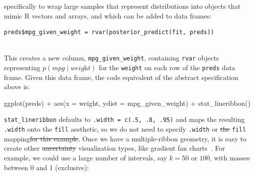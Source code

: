 \documentclass[journal]{vgtc}                     %
\newenvironment{centerverbatim}{%
\setlength{\parskip}{.4\belowdisplayskip}%
\vspace{.55\abovedisplayskip}%
\noindent%
\small%
\centering%
\varwidth{\linewidth}%
\verbatim
}{%
\endverbatim%
\endvarwidth%
\par%
\hfill\break%
}
\providecommand{\DIFdel}[1]{{\protect\color{red}\sout{#1}}}                      %
\providecommand{\DIFdelbegin}{} %
\providecommand{\DIFdelend}{} %
\begin{document}
\addtocounter{footnote}{-1}%
\DIFdelend specifically to wrap large samples that represent distributions into objects that mimic R vectors and arrays,
and which can be added to data frames:

\begin{minipage}{\columnwidth}
\vspace{\abovedisplayskip}
\small
\centering
\begin{verbatim}
preds$mpg_given_weight = rvar(posterior_predict(fit, preds))
\end{verbatim}
\end{minipage}\vspace{\belowdisplayskip}\\
This creates a new column, \texttt{mpg\_given\_weight}, containing \texttt{rvar} objects representing $p(\textit{mpg} \mid \textit{weight})$ for the \texttt{weight} on each row of the \texttt{preds} data frame. Given this data frame, the code equivalent of the abstract specification above is:

\begin{centerverbatim}
ggplot(preds) +
  aes(x = weight, ydist = mpg_given_weight) +
  stat_lineribbon()
\end{centerverbatim}
\texttt{stat\_lineribbon} defaults to \texttt{.width = c(.5, .8, .95)} and maps the resulting \texttt{.width} onto the \texttt{fill} aesthetic, so we do not need to specify \texttt{.width} or \DIFdelbegin \DIFdel{the }\DIFdelend \texttt{fill} mapping\DIFdelbegin \DIFdel{for this example}\DIFdelend . Once we have a multiple-ribbon geometry, it is easy to create other \DIFdelbegin \DIFdel{uncertainty }\DIFdelend visualization types, like gradient fan charts~\cite{bowman2019graphics,jackson2008displaying}. For example, we could use a large number of intervals, say $k = 50$ or $100$, with masses between 0 and 1 (exclusive):
\end{document}
